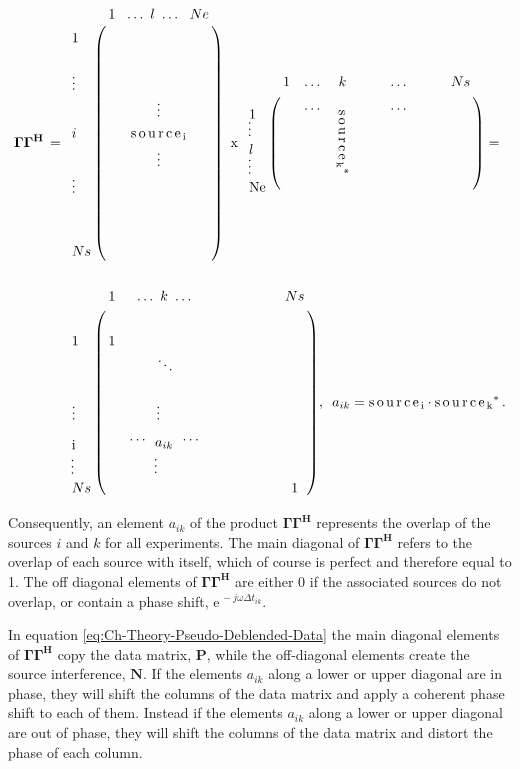 \begin{equation}
	\begin{aligned}
	\mathbf{\Gamma \Gamma ^H} \, = \,\,\, &
	\bordermatrix{
  				& 1 \,\,\,\, \dots \,\, l \,\,\dots  		\,\,\,\, Ne			\cr
  	  1			&																\cr	
	    		&        			 					 						\cr
	  \vdots 	& 		 						 								\cr
      	 		& \vdots	   							 			   				\cr
      i  		& \mathrm{s\,o\,u\,r\,c\,e_{\,i}	}								\cr
      		 	& \vdots		 		 					 						\cr
      \vdots 	& 		 														\cr
      		 	& 		 			 					 		 				\cr
   				&										  						\cr	     
      Ns 		& 	 	 		 						 		 		  			
	}
%	 
	\,\,\,\mathrm{x} \,\,\,
%
%
	\bordermatrix{
  	 & 1	& \dots  & k &&& \dots &&& Ns 														\cr
  	 \rotatebox{270}{\rotatebox{90}{1}$\,\dots$ \rotatebox{90}{$l$} $\dots\,$ \rotatebox{90}{Ne}} 
  	 && \dots & \rotatebox{270}{$\mathrm{s\,o\,u\,r\,c\,e_{\,k}}^*$} &&& \dots &&&  	 			\cr	
	  	} = \\
	 &\\
%
%  	
	& \bordermatrix{
  														& 1	& \dots\,\,k\,\,\dots &&&&&& Ns  \cr
  														&	&				      &&&&&&	 \cr	
	  1 												& 1 & 		 			  &&&&&&  	 \cr
       													& 	&  \ddots 			  &&&&&& 	 \cr
      		 											& 	& 		 			  &&&&&& 	 \cr
      \vdots											& 	& \vdots	 \,\,\,\,\,\, &&&&&&	 \cr
      \rotatebox{270}{\rotatebox{90}{i}$\,\,\,\,\dots$} & 	& \dots \,\,\, %
      		\rotatebox{270}{\rotatebox{90}{$a_{ik}$}$\,\,\,\,\dots$} \,\,\, \dots &&&&&& 	 \cr 
      Ns 												& 	& 		 			  &&&&&& 1   			
	}, 
%
	\,\,\,a_{ik} = \mathrm{s\,o\,u\,r\,c\,e_{\,i}} \cdot \mathrm{s\,o\,u\,r\,c\,e_{\,k}}^*\,.
	\end{aligned}
	\label{eq:Ch-Theory-G-GH}
\end{equation}

 Consequently, an element $a_{ik}$ of the product $\mathbf{\Gamma \Gamma ^H}$ represents the overlap of the sources $i$ and $k$ for all experiments. The main diagonal of $\mathbf{\Gamma \Gamma ^H}$ refers to the overlap of each source with itself, which of course is perfect and therefore equal to 1. The off diagonal elements of $\mathbf{\Gamma \Gamma ^H}$ are either 0 if the associated sources do not overlap, or contain a phase shift, $\mathrm{e}^{\, -j \omega \Delta t_{ik}}$.
  

In equation \ref{eq:Ch-Theory-Pseudo-Deblended-Data} the main diagonal elements of $\mathbf{\Gamma \Gamma ^H}$ copy the data matrix, $\mathbf{P}$, while the off-diagonal elements create the source interference, $\mathbf{N}$. If the elements $a_{ik}$ along a lower or upper diagonal are in phase, they will shift the columns of the data matrix and apply a coherent phase shift to each of them. Instead if the elements $a_{ik}$ along a lower or upper diagonal are out of phase, they will shift the columns of the data matrix and distort the phase of each column. 


